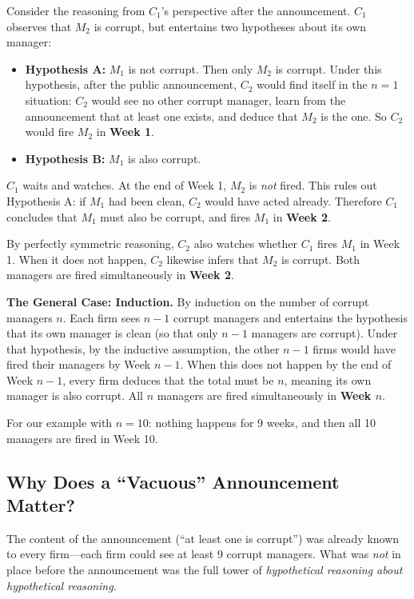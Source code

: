 Consider the reasoning from $C_1$'s perspective after the announcement. $C_1$ observes that $M_2$ is corrupt, but entertains two hypotheses about its own manager:
\begin{itemize}
  \item \textbf{Hypothesis A:} $M_1$ is not corrupt. Then only $M_2$ is corrupt. Under this hypothesis, after the public announcement, $C_2$ would find itself in the $n = 1$ situation: $C_2$ would see no other corrupt manager, learn from the announcement that at least one exists, and deduce that $M_2$ is the one. So $C_2$ would fire $M_2$ in \textbf{Week 1}.
  \item \textbf{Hypothesis B:} $M_1$ is also corrupt.
\end{itemize}
$C_1$ waits and watches. At the end of Week 1, $M_2$ is \textit{not} fired. This rules out Hypothesis A: if $M_1$ had been clean, $C_2$ would have acted already. Therefore $C_1$ concludes that $M_1$ must also be corrupt, and fires $M_1$ in \textbf{Week 2}.

By perfectly symmetric reasoning, $C_2$ also watches whether $C_1$ fires $M_1$ in Week 1. When it does not happen, $C_2$ likewise infers that $M_2$ is corrupt. Both managers are fired simultaneously in \textbf{Week 2}.

\medskip
\noindent\textbf{The General Case: Induction.}
By induction on the number of corrupt managers $n$. Each firm sees $n - 1$ corrupt managers and entertains the hypothesis that its own manager is clean (so that only $n - 1$ managers are corrupt). Under that hypothesis, by the inductive assumption, the other $n-1$ firms would have fired their managers by Week $n - 1$. When this does not happen by the end of Week $n - 1$, every firm deduces that the total must be $n$, meaning its own manager is also corrupt. All $n$ managers are fired simultaneously in \textbf{Week $n$}.

For our example with $n = 10$: nothing happens for 9 weeks, and then all 10 managers are fired in Week 10.

\subsection{Why Does a ``Vacuous'' Announcement Matter?}

The content of the announcement (``at least one is corrupt'') was already known to every firm---each firm could see at least 9 corrupt managers. What was \textit{not} in place before the announcement was the full tower of \textit{hypothetical reasoning about hypothetical reasoning}.

